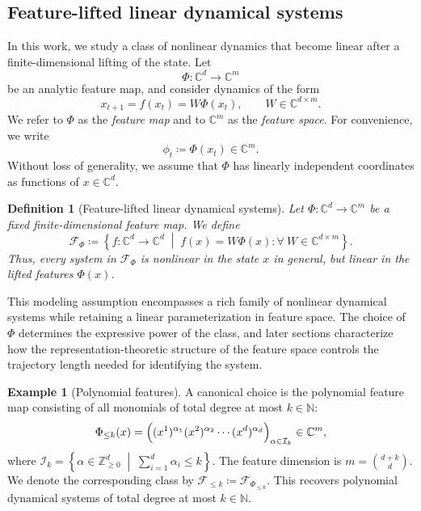 \documentclass[11pt]{article}
\theoremstyle{plain}
\newtheorem{definition}[theorem]{Definition}
\theoremstyle{definition}
\newtheorem{example}[theorem]{Example}
\theoremstyle{remark}
\begin{document}
 
\subsection{Feature-lifted linear dynamical systems}

In this work, we study a class of nonlinear dynamics that become linear after a finite-dimensional lifting of the state. Let
\[
\Phi:\mathbb C^d\to \mathbb C^m
\]
be an analytic feature map, and consider dynamics of the form
\begin{equation}
    x_{t+1}=f(x_t)=W\Phi(x_t),
    \qquad
    W\in \mathbb C^{d\times m}.
\end{equation}
We refer to \(\Phi\) as the \emph{feature map} and to \(\mathbb C^m\) as the \emph{feature space}. For convenience, we write
\[
    \phi_t \coloneqq \Phi(x_t)\in \mathbb C^m .
\]
Without loss of generality, we assume that $\Phi$ has linearly independent coordinates as functions of $x \in \mathbb{C}^d$.


\begin{definition}[Feature-lifted linear dynamical systems]
Let \(\Phi:\mathbb C^d\to \mathbb C^m\) be a fixed finite-dimensional feature map. We define
\[
\mathcal F_\Phi
\coloneqq
\left\{
f:\mathbb C^d\to \mathbb C^d
\;\middle|\;
f(x)=W\Phi(x) : \forall ~W\in \mathbb C^{d\times m}
\right\}.
\]
Thus, every system in \(\mathcal F_\Phi\) is nonlinear in the state \(x\) in general, but linear in the lifted features \(\Phi(x)\).
\end{definition}

This modeling assumption encompasses a rich family of nonlinear dynamical systems while retaining a linear parameterization in feature space. The choice of \(\Phi\) determines the expressive power of the class, and later sections characterize how the representation-theoretic structure of the feature space controls the trajectory length needed for identifying the system.

\begin{example}[Polynomial features]
A canonical choice is the polynomial feature map consisting of all monomials of total degree at most \(k \in \mathbb{N}\):
\[
\Phi_{\le k}(x)
=
\Bigl(
(x^{1})^{\alpha_1} (x^{2})^{\alpha_2} \cdots (x^{d})^{\alpha_d}
\Bigr)_{\alpha \in \mathcal{I}_k}
\in \mathbb C^m,
\]
where
$
\mathcal{I}_k
=
\left\{
\alpha \in \mathbb Z_{\ge 0}^d
\;\middle|\;
\sum_{i=1}^d \alpha_i \le k
\right\}.
$
The feature dimension is
$
m=\binom{d+k}{d}.
$
We denote the corresponding class by
$
\mathcal F_{\le k}
\coloneqq
\mathcal F_{\Phi_{\le k}}.
$
This recovers polynomial dynamical systems of total degree at most \(k \in \mathbb{N}\).
\end{example}
\end{document}

